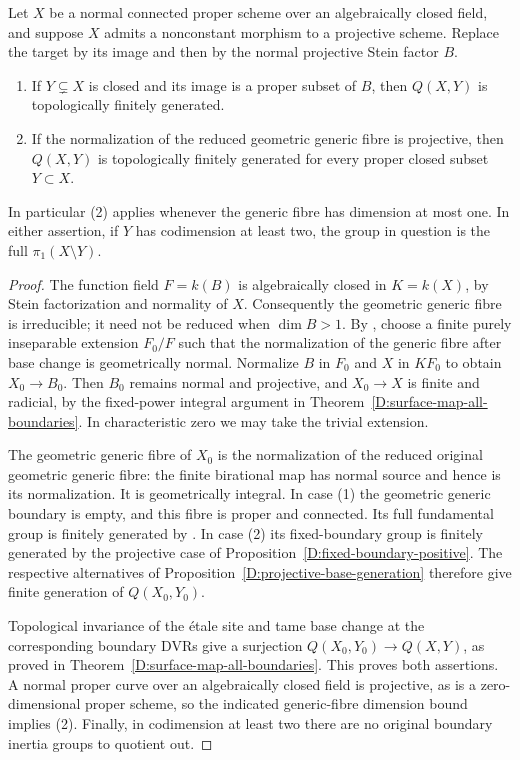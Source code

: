 \begin{corollary}
\label{D:projective-image-corollaries}
Let $X$ be a normal connected proper scheme over an
algebraically closed field, and suppose $X$ admits a
nonconstant morphism to a projective scheme.
Replace the target by its image and then by the normal
projective Stein factor $B$.
\begin{enumerate}
\item If $Y\subsetneq X$ is closed and its image is a
proper subset of $B$, then $Q(X,Y)$ is topologically
finitely generated.
\item If the normalization of the reduced geometric
generic fibre is projective, then $Q(X,Y)$ is
topologically finitely generated for every proper
closed subset $Y\subset X$.
\end{enumerate}
In particular (2) applies whenever the generic fibre
has dimension at most one.  In either assertion, if
$Y$ has codimension at least two, the group in question
is the full $\pi_1(X\setminus Y)$.
\end{corollary}
\begin{proof}
The function field $F=k(B)$ is algebraically closed in
$K=k(X)$, by Stein factorization and normality of $X$.
Consequently the geometric generic fibre is irreducible;
it need not be reduced when $\dim B>1$.
By \cite[Lemma 33.27.4, tag 0BXT]{C_StacksLogFibration},
choose a finite purely inseparable extension $F_0/F$
such that the normalization of the generic fibre after
base change is geometrically normal.  Normalize $B$
in $F_0$ and $X$ in $KF_0$ to obtain $X_0\to B_0$.
Then $B_0$ remains normal and projective, and $X_0\to X$
is finite and radicial, by the fixed-power integral
argument in Theorem~\ref{D:surface-map-all-boundaries}.
In characteristic zero we may take the trivial extension.

The geometric generic fibre of $X_0$ is the normalization
of the reduced original geometric generic fibre: the
finite birational map has normal source and hence is
its normalization.  It is geometrically integral.
In case (1) the geometric generic boundary is empty,
and this fibre is proper and connected.  Its full
fundamental group is finitely generated by
\cite[X, Theorem 2.9, pp. 273--274]{SGA1}.
In case (2) its fixed-boundary group is finitely generated
by the projective case of
Proposition~\ref{D:fixed-boundary-positive}.
The respective alternatives of
Proposition~\ref{D:projective-base-generation} therefore
give finite generation of $Q(X_0,Y_0)$.

Topological invariance of the \'etale site and tame
base change at the corresponding boundary DVRs give
a surjection $Q(X_0,Y_0)\to Q(X,Y)$, as proved in
Theorem~\ref{D:surface-map-all-boundaries}.  This proves
both assertions.  A normal proper curve over an
algebraically closed field is projective, as is a
zero-dimensional proper scheme, so the indicated
generic-fibre dimension bound implies (2).
Finally, in codimension at least two there are no
original boundary inertia groups to quotient out.
\end{proof}

